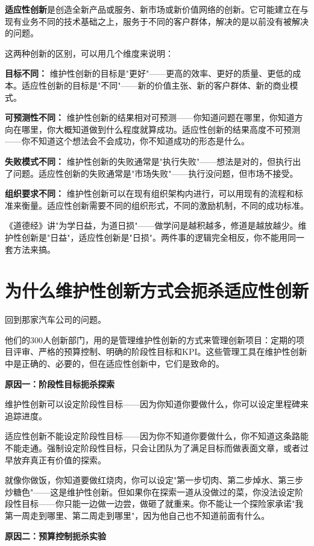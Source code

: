 \textbf{适应性创新}是创造全新产品或服务、新市场或新价值网络的创新。它可能建立在与现有业务不同的技术基础之上，服务于不同的客户群体，解决的是以前没有被解决的问题。

这两种创新的区别，可以用几个维度来说明：

\textbf{目标不同：} 维护性创新的目标是"更好"——更高的效率、更好的质量、更低的成本。适应性创新的目标是"不同"——新的价值主张、新的客户群体、新的商业模式。

\textbf{可预测性不同：} 维护性创新的结果相对可预测——你知道问题在哪里，你知道方向在哪里，你大概知道做到什么程度就算成功。适应性创新的结果高度不可预测——你不知道这个想法会不会成功，你不知道成功的形态是什么。

\textbf{失败模式不同：} 维护性创新的失败通常是"执行失败"——想法是对的，但执行出了问题。适应性创新的失败通常是"市场失败"——执行没问题，但市场不接受。

\textbf{组织要求不同：} 维护性创新可以在现有组织架构内进行，可以用现有的流程和标准来衡量。适应性创新需要不同的组织形式，不同的激励机制，不同的成功标准。

《道德经》讲"为学日益，为道日损"——做学问是越积越多，修道是越放越少。维护性创新是"日益"，适应性创新是"日损"。两件事的逻辑完全相反，你不能用同一套方法来搞。

\section{为什么维护性创新方式会扼杀适应性创新}


回到那家汽车公司的问题。

他们的300人创新部门，用的是管理维护性创新的方式来管理创新项目：定期的项目评审、严格的预算控制、明确的阶段性目标和KPI。这些管理工具在维护性创新中是正确的、必要的，但在适应性创新中，它们是致命的。

\textbf{原因一：阶段性目标扼杀探索}

维护性创新可以设定阶段性目标——因为你知道你要做什么，你可以设定里程碑来追踪进度。

适应性创新不能设定阶段性目标——因为你不知道你要做什么，你不知道这条路能不能走通。强制设定阶段性目标，只会让团队为了满足目标而做表面文章，或者过早放弃真正有价值的探索。

就像你做饭，你知道要做红烧肉，你可以设定"第一步切肉、第二步焯水、第三步炒糖色"——这是维护性创新。但如果你在探索一道从没做过的菜，你没法设定阶段性目标——你只能一边做一边尝，做砸了就重来。你不能让一个探险家承诺"我第一周走到哪里、第二周走到哪里"，因为他自己也不知道前面有什么。

\textbf{原因二：预算控制扼杀实验}

